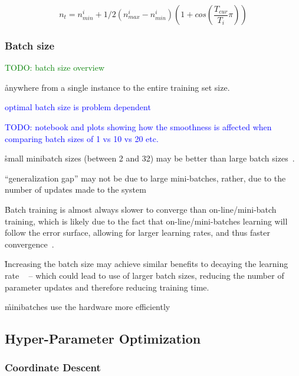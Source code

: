 \begin{equation}
{n_t = n_{min}^i + 1/2(n_{max}^i - n_{min}^i)(1 + cos(\frac{T_{cur}}{T_i}\pi))}
\label{eq:sgdr_def}
\end{equation}

\subsubsection{Batch size}

\textcolor{green}{TODO: batch size overview}

\r{anywhere from a single instance to the entire training set size.}

\textcolor{blue}{optimal batch size is problem dependent}

\textcolor{blue}{TODO: notebook and plots showing how the smoothness is affected when comparing batch sizes of 1 vs 10 vs 20 etc.}


\r{small minibatch sizes (between 2 and 32) may be better than large batch sizes~\cite{masters2018revisiting}.}

\r{``generalization gap'' may not be due to large mini-batches, rather, due to the number of updates made to the system~\cite{hoffer2017train}}

\r{Batch training is almost always slower to converge than on-line/mini-batch training, which is likely due to the fact that on-line/mini-batches learning will follow the error surface, allowing for larger learning rates, and thus faster convergence~\cite{wilson2003general}.}

\r{Increasing the batch size may achieve similar benefits to decaying the learning rate ~\cite{smith2017don} -- which could lead to use of larger batch sizes, reducing the number of parameter updates and therefore reducing training time.}

\r{minibatches use the hardware more efficiently}


\subsection{Hyper-Parameter Optimization}

\subsubsection{Coordinate Descent}

